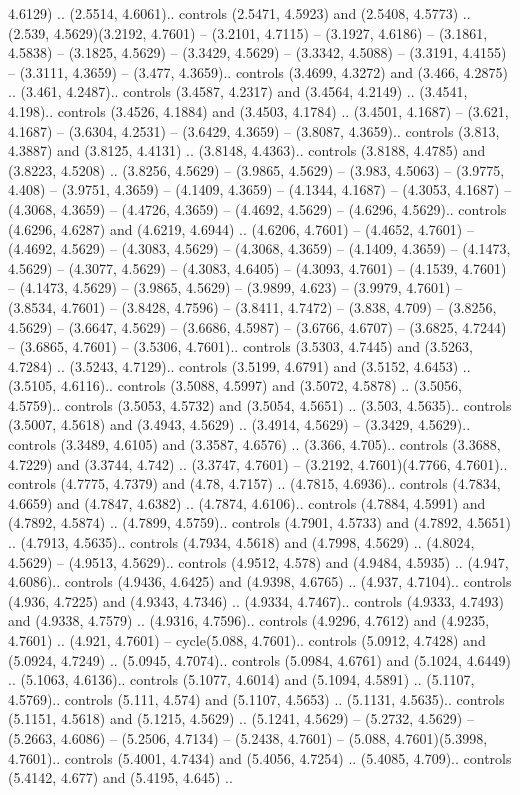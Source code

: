 4.6129) .. (2.5514, 4.6061).. controls (2.5471, 4.5923) and (2.5408, 4.5773) .. (2.539, 4.5629)(3.2192, 4.7601) -- (3.2101, 4.7115) -- (3.1927, 4.6186) -- (3.1861, 4.5838) -- (3.1825, 4.5629) -- (3.3429, 4.5629) -- (3.3342, 4.5088) -- (3.3191, 4.4155) -- (3.3111, 4.3659) -- (3.477, 4.3659).. controls (3.4699, 4.3272) and (3.466, 4.2875) .. (3.461, 4.2487).. controls (3.4587, 4.2317) and (3.4564, 4.2149) .. (3.4541, 4.198).. controls (3.4526, 4.1884) and (3.4503, 4.1784) .. (3.4501, 4.1687) -- (3.621, 4.1687) -- (3.6304, 4.2531) -- (3.6429, 4.3659) -- (3.8087, 4.3659).. controls (3.813, 4.3887) and (3.8125, 4.4131) .. (3.8148, 4.4363).. controls (3.8188, 4.4785) and (3.8223, 4.5208) .. (3.8256, 4.5629) -- (3.9865, 4.5629) -- (3.983, 4.5063) -- (3.9775, 4.408) -- (3.9751, 4.3659) -- (4.1409, 4.3659) -- (4.1344, 4.1687) -- (4.3053, 4.1687) -- (4.3068, 4.3659) -- (4.4726, 4.3659) -- (4.4692, 4.5629) -- (4.6296, 4.5629).. controls (4.6296, 4.6287) and (4.6219, 4.6944) .. (4.6206, 4.7601) -- (4.4652, 4.7601) -- (4.4692, 4.5629) -- (4.3083, 4.5629) -- (4.3068, 4.3659) -- (4.1409, 4.3659) -- (4.1473, 4.5629) -- (4.3077, 4.5629) -- (4.3083, 4.6405) -- (4.3093, 4.7601) -- (4.1539, 4.7601) -- (4.1473, 4.5629) -- (3.9865, 4.5629) -- (3.9899, 4.623) -- (3.9979, 4.7601) -- (3.8534, 4.7601) -- (3.8428, 4.7596) -- (3.8411, 4.7472) -- (3.838, 4.709) -- (3.8256, 4.5629) -- (3.6647, 4.5629) -- (3.6686, 4.5987) -- (3.6766, 4.6707) -- (3.6825, 4.7244) -- (3.6865, 4.7601) -- (3.5306, 4.7601).. controls (3.5303, 4.7445) and (3.5263, 4.7284) .. (3.5243, 4.7129).. controls (3.5199, 4.6791) and (3.5152, 4.6453) .. (3.5105, 4.6116).. controls (3.5088, 4.5997) and (3.5072, 4.5878) .. (3.5056, 4.5759).. controls (3.5053, 4.5732) and (3.5054, 4.5651) .. (3.503, 4.5635).. controls (3.5007, 4.5618) and (3.4943, 4.5629) .. (3.4914, 4.5629) -- (3.3429, 4.5629).. controls (3.3489, 4.6105) and (3.3587, 4.6576) .. (3.366, 4.705).. controls (3.3688, 4.7229) and (3.3744, 4.742) .. (3.3747, 4.7601) -- (3.2192, 4.7601)(4.7766, 4.7601).. controls (4.7775, 4.7379) and (4.78, 4.7157) .. (4.7815, 4.6936).. controls (4.7834, 4.6659) and (4.7847, 4.6382) .. (4.7874, 4.6106).. controls (4.7884, 4.5991) and (4.7892, 4.5874) .. (4.7899, 4.5759).. controls (4.7901, 4.5733) and (4.7892, 4.5651) .. (4.7913, 4.5635).. controls (4.7934, 4.5618) and (4.7998, 4.5629) .. (4.8024, 4.5629) -- (4.9513, 4.5629).. controls (4.9512, 4.578) and (4.9484, 4.5935) .. (4.947, 4.6086).. controls (4.9436, 4.6425) and (4.9398, 4.6765) .. (4.937, 4.7104).. controls (4.936, 4.7225) and (4.9343, 4.7346) .. (4.9334, 4.7467).. controls (4.9333, 4.7493) and (4.9338, 4.7579) .. (4.9316, 4.7596).. controls (4.9296, 4.7612) and (4.9235, 4.7601) .. (4.921, 4.7601) -- cycle(5.088, 4.7601).. controls (5.0912, 4.7428) and (5.0924, 4.7249) .. (5.0945, 4.7074).. controls (5.0984, 4.6761) and (5.1024, 4.6449) .. (5.1063, 4.6136).. controls (5.1077, 4.6014) and (5.1094, 4.5891) .. (5.1107, 4.5769).. controls (5.111, 4.574) and (5.1107, 4.5653) .. (5.1131, 4.5635).. controls (5.1151, 4.5618) and (5.1215, 4.5629) .. (5.1241, 4.5629) -- (5.2732, 4.5629) -- (5.2663, 4.6086) -- (5.2506, 4.7134) -- (5.2438, 4.7601) -- (5.088, 4.7601)(5.3998, 4.7601).. controls (5.4001, 4.7434) and (5.4056, 4.7254) .. (5.4085, 4.709).. controls (5.4142, 4.677) and (5.4195, 4.645) .. 